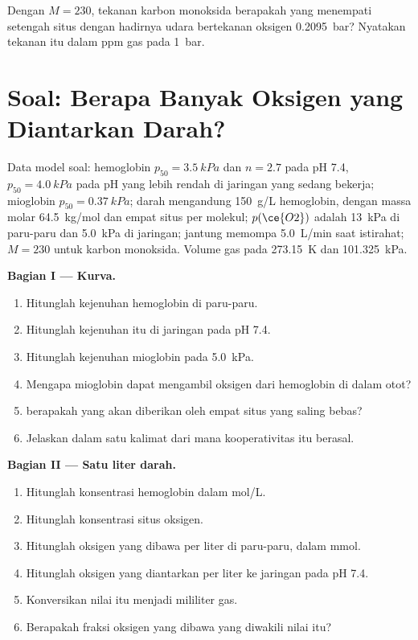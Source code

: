 \begin{exercise}[$\star\star\star$]\label{exo:b3:bioinorganic:12}
Dengan $M = 230$, tekanan karbon monoksida berapakah yang menempati setengah situs dengan
hadirnya udara bertekanan oksigen \qty{0.2095}{bar}? Nyatakan tekanan itu dalam ppm gas pada \qty{1}{bar}.
\end{exercise}

\section{Soal: Berapa Banyak Oksigen yang Diantarkan Darah?}

\begin{problem}
\label{pb:b3:bioinorganic:1}
Data model soal: hemoglobin $p_{50} = \qty{3.5}{kPa}$ dan $n = 2.7$ pada pH 7.4, $p_{50} = \qty{4.0}{kPa}$ pada
pH yang lebih rendah di jaringan yang sedang bekerja; mioglobin $p_{50} = \qty{0.37}{kPa}$; darah mengandung \qty{150}{g/L}
hemoglobin, dengan massa molar \qty{64.5}{kg/mol} dan empat situs per molekul; $p(\ce{O2})$ adalah \qty{13}{kPa}
di paru-paru dan \qty{5.0}{kPa} di jaringan; jantung memompa \qty{5.0}{L/min} saat istirahat;
$M = 230$ untuk karbon monoksida. Volume gas pada \qty{273.15}{K} dan \qty{101.325}{kPa}.

\medskip\noindent\textbf{Bagian I --- Kurva.}
\begin{enumerate}[beginpenalty=10000]
  \item Hitunglah kejenuhan hemoglobin di paru-paru.
  \item Hitunglah kejenuhan itu di jaringan pada pH 7.4.
  \item Hitunglah kejenuhan mioglobin pada \qty{5.0}{kPa}.
  \item Mengapa mioglobin dapat mengambil oksigen dari hemoglobin di dalam otot?
  \item {} berapakah yang akan diberikan oleh empat situs yang saling bebas?
  \item Jelaskan dalam satu kalimat dari mana kooperativitas itu berasal.
\end{enumerate}

\medskip\noindent\textbf{Bagian II --- Satu liter darah.}
\begin{enumerate}[resume, beginpenalty=10000]
  \item Hitunglah konsentrasi hemoglobin dalam mol/L.
  \item Hitunglah konsentrasi situs oksigen.
  \item Hitunglah oksigen yang dibawa per liter di paru-paru, dalam mmol.
  \item Hitunglah oksigen yang diantarkan per liter ke jaringan pada pH 7.4.
  \item Konversikan nilai itu menjadi mililiter gas.
  \item Berapakah fraksi oksigen yang dibawa yang diwakili nilai itu?
\end{enumerate}


\end{problem}
